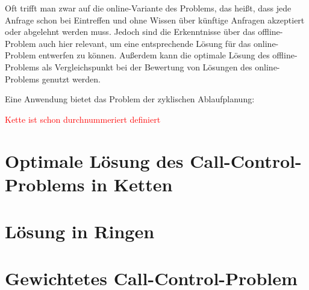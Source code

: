 \documentclass[11pt]{article}
\theoremstyle{definition}
\theoremstyle{theorem}
\theoremstyle{theorem}
\newcommand\todo[1]{\textcolor{red}{#1}}
\begin{document}
    Oft trifft man zwar auf die online-Variante des Problems, das heißt, dass jede Anfrage schon bei Eintreffen und
    ohne Wissen über künftige Anfragen akzeptiert oder abgelehnt werden muss.
    Jedoch sind die Erkenntnisse über das offline-Problem auch hier relevant, um eine entsprechende Lösung für das
    online-Problem entwerfen zu können.
    Außerdem kann die optimale Lösung des offline-Problems als Vergleichspunkt bei der Bewertung von Lösungen des
    online-Problems genutzt werden.

    Eine Anwendung bietet das Problem der zyklischen Ablaufplanung:

    \todo{Kette ist schon durchnummeriert definiert}

	\section{Optimale Lösung des Call-Control-Problems in Ketten}\label{sec:call-control-in-chains}
	

    \section{Lösung in Ringen}\label{sec:call-control-in-rings}
    

    \section{Gewichtetes Call-Control-Problem}\label{sec:weighted-call-control}
    
\end{document}
